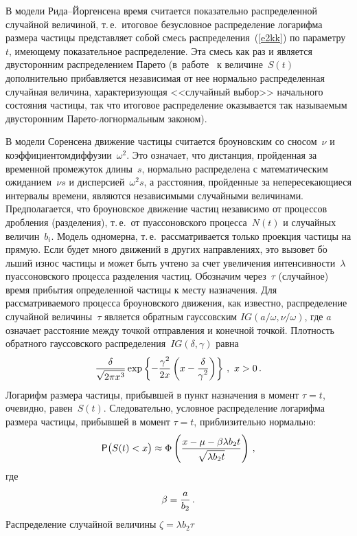 \begin{multicols}{2}
В модели Рида--Йоргенсена время считается показательно
распределенной случайной величиной, т.\,е.\ итоговое безусловное
распределение лога\-риф\-ма размера частицы представляет собой смесь\linebreak
рас\-пределения~(\ref{e2kk}) по параметру~$t$, имеющему показательное
распределение. Эта смесь как раз и является двусторонним
распределением Парето\linebreak
 (в~работе~\cite{4kk} к величине~$S(t)$
дополнительно прибавляется независимая от нее нормально
распределенная случайная величина, характеризующая <<случайный
выбор>> начального состояния частицы, так что итоговое
распределение оказывается так называемым двусторонним
Парето-логнормальным законом).

В модели Соренсена движение частицы считается броуновским со
сносом~$\nu$ и коэффициентом\linebreak диффузии~$\omega^{2}$. Это означает,
что дистанция, пройден\-ная за временной промежуток длины~$s$,
нормально распределена с математическим ожиданием~$\nu s$ и
дисперсией~$\omega^{2}s$, а расстояния, пройден\-ные за
непересекающиеся интервалы времени, являются независимыми
случайными величинами. Предполагается, что броуновское движение
частиц независимо от процессов дробления (разделения), т.\,е.\ от
пуассоновского процесса~$N(t)$ и случайных величин~$b_{i}$. Модель
одномерна, т.\,е.\ рассматривается только проекция частицы на
прямую. Если будет много движений в других направлениях, это
вызовет б{$\acute{\mbox{о}}$}льший износ частицы и может быть учтено за счет
увеличения интенсивности~$\lambda$ пуассоновского процесса
разделения частиц. Обозначим через~$\tau$ (случайное) время
прибытия определенной частицы к месту назначения. Для
рас\-смат\-ри\-ва\-емо\-го процесса броуновского движения, как известно,
распределение случайной величины~$\tau$ является обратным
гауссовским $IG(a/\omega,\nu/\omega)$, где $a$ означает расстояние
между точкой отправления и конечной точкой. Плотность обратного
гауссовского распределения~$IG(\delta,\gamma)$ равна
$$
\displaystyle\frac{\displaystyle \delta\mathstrut}{\displaystyle \sqrt{2\pi
x^{3}}\mathstrut}\exp\left\{-\displaystyle\frac{\displaystyle \gamma^{2}\mathstrut}{\displaystyle 2x\mathstrut}\left(x-\displaystyle\frac{\displaystyle \delta\mathstrut}{\displaystyle \gamma^{2}\mathstrut}\right)\right\}\,,\
x>0\,.
$$
Логарифм размера частицы, прибывшей в пункт назначения в момент
$\tau=t$, очевидно, равен~$S(t)$. Следовательно, условное
распределение логарифма размера частицы, прибывшей в момент
$\tau=t$, приблизительно нормально:
$$
{\sf P}\big(S(t)<x\big)\approx\Phi\left(\displaystyle\frac{\displaystyle x-\mu-\beta\lambda
b_{2}t\mathstrut}{\displaystyle \sqrt{\lambda b_{2}t}\mathstrut}\right)\,,
$$
где
$$
\beta = \displaystyle\frac{\displaystyle a\mathstrut}{\displaystyle b_{2}\mathstrut}\,.
$$
Распределение случайной величины $\zeta=\lambda b_{2}\tau$

\end{multicols}
